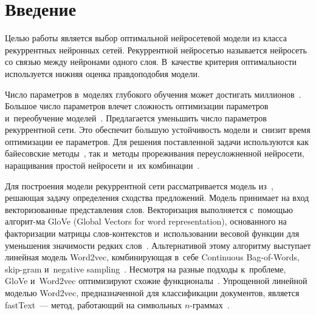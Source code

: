 \begin{multicols}{2}

\label{st\stat}

\section{Введение}

Целью работы является выбор оптимальной нейросетевой модели  из класса 
рекуррентных нейронных сетей. Рекуррентной нейросетью называется нейросеть со 
связью между нейронами одного слоя. В~качестве критерия оптимальности 
используется нижняя оценка правдоподобия модели.

Число параметров в~моделях глубокого обучения может достигать 
миллионов~\cite{DeepGoogle}. Большое число параметров влечет сложность 
оптимизации параметров и~переобучение моделей~\cite{Bishop}. Предлагается 
уменьшить число параметров рекуррентной сети. Это обеспечит б$\acute{\mbox{о}}$льшую 
устойчивость модели и~снизит время оптимизации ее параметров. Для решения 
поставленной задачи используются как байесовские методы~\cite{Strijov_1}, так 
и~методы прореживания переусложненной нейросети, наращивания простой нейросети 
и~их комбинации~\cite{Strijov_2}.

Для построения модели рекуррентной сети рассматривается модель 
из~\cite{Sanborn}, решающая задачу определения сходства предложений.
Модель при\-ни\-мает на вход векторизованные представления слов. Векторизация 
выполняется с~по\-мощью алгорит-\linebreak ма GloVe (Global Vectors for word representation), осно\-ван\-но\-го на факторизации матрицы 
слов-кон\-текс\-тов и~использовании весовой функции для уменьшения значимости редких 
слов~\cite{GloVe}. Альтернативой этому алгоритму выступает линейная модель 
Word2vec, комбинирующая в~себе Continuous Bag-of-Words, skip-gram и~negative 
sampling~\cite{word2vec}. Несмотря на разные подходы к~проблеме, GloVe 
и~Word2vec оптимизируют схожие функционалы~\cite{Glo2vec}. Упрощенной линейной 
моделью Word2vec, предназначенной для классификации документов, является 
fastText~--- метод, работающий на символьных $n$-грам\-мах~\cite{fastText}.



\end{multicols}
